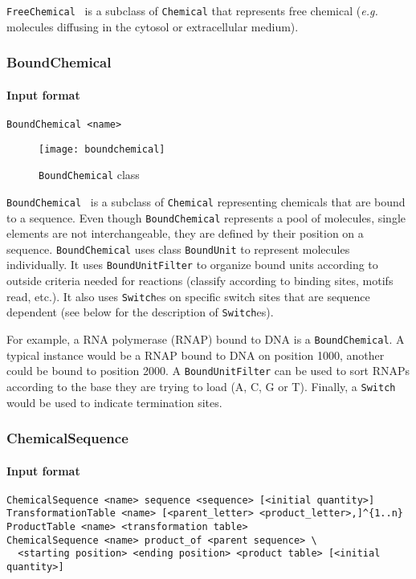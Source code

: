 \texttt{FreeChemical}~ is a subclass of \texttt{Chemical}
that represents free chemical (\textit{e.g.} molecules diffusing in the cytosol or extracellular medium).

\subsubsection{BoundChemical}

\paragraph{Input format}
\begin{verbatim}
BoundChemical <name>
\end{verbatim}

\begin{figure}[!h]
  \centering
  \texttt{[image: boundchemical]}
  \caption{\texttt{BoundChemical} class}
\label{fig:bound_chemical}
\end{figure}

\texttt{BoundChemical}~ is a subclass of \texttt{Chemical}
representing chemicals that are bound to a sequence.
Even though \texttt{BoundChemical} represents a pool of molecules,
single elements are not interchangeable,
they are defined by their position on a sequence.
\texttt{BoundChemical} uses class \texttt{BoundUnit} to represent molecules individually.
It uses \texttt{BoundUnitFilter} to organize bound units according to outside criteria
needed for reactions (classify according to binding sites, motifs read, etc.).
It also uses \texttt{Switch}es on specific switch sites that are sequence dependent
(see below for the description of \texttt{Switch}es).

For example, a RNA polymerase (RNAP) bound to DNA is a \texttt{BoundChemical}.
A typical instance would be a RNAP bound to DNA on position 1000,
another could be bound to position 2000.
A \texttt{BoundUnitFilter} can be used to sort RNAPs according to the base
they are trying to load (A, C, G or T).
Finally, a \texttt{Switch} would be used to indicate termination sites.

\subsubsection{ChemicalSequence}

\paragraph{Input format}
\begin{verbatim}
ChemicalSequence <name> sequence <sequence> [<initial quantity>]
TransformationTable <name> [<parent_letter> <product_letter>,]^{1..n}
ProductTable <name> <transformation table>
ChemicalSequence <name> product_of <parent sequence> \
  <starting position> <ending position> <product table> [<initial quantity>]
\end{verbatim}


